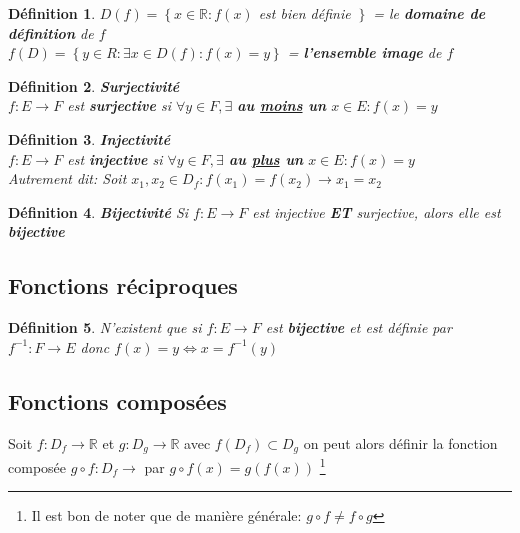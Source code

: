 \documentclass[10pt,a4paper]{book}
\newcommand{\R}{\mathbb{R}}
\newtheorem{definition}{Définition}[section]
\begin{document}
\begin{definition}
$D(f) = \left\lbrace x \in \R: f(x) \right.$ est bien définie $\left. \right\rbrace$ = le \textbf{domaine de définition} de $f$ \\
$f(D) = \left\lbrace y \in R: \exists x \in D(f): f(x) = y \right\rbrace$ = \textbf{l'ensemble image} de $f$
\end{definition}

\begin{definition} \textbf{Surjectivité}\\
$f: E \rightarrow F$ est \textbf{surjective} si $\forall y \in F, \exists$ \textbf{au \underline{moins} un} $x\in E: f(x) = y$
\end{definition}

\begin{definition} \textbf{Injectivité}\\
$f: E \rightarrow F$ est \textbf{injective} si $\forall y \in F, \exists$ \textbf{au \underline{plus} un} $x\in E: f(x) = y$ \\
Autrement dit: Soit $x_1, x_2 \in D_f: f(x_1) = f(x_2) \rightarrow x_1 = x_2$
\end{definition}

\begin{definition} \textbf{Bijectivité}
Si $f: E \rightarrow F$ est injective \textbf{ET} surjective, alors elle est \textbf{bijective}
\end{definition}

\subsection{Fonctions réciproques}

\begin{definition}
N'existent que si $f: E \rightarrow F$ est \textbf{bijective} et est définie par $f^{-1}: F \rightarrow E$ donc $f(x) = y \Leftrightarrow x = f^{-1}(y)$
\end{definition}

\subsection{Fonctions composées}

Soit $f: D_f \rightarrow \R$ et $g: D_g \rightarrow \R$ avec $f(D_f) \subset D_g$ on peut alors définir la fonction composée $g\circ f : D_f \rightarrow$ par $g\circ f(x) = g(f(x))$ \footnote{Il est bon de noter que de manière générale: $g\circ f \neq f\circ g$}
\end{document}
